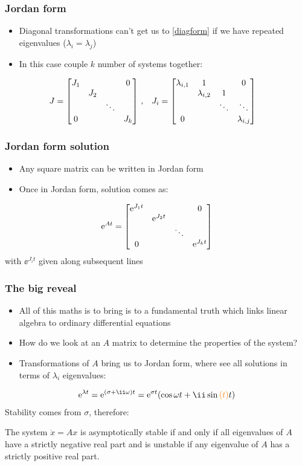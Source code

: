 \documentclass{beamer-control}
\begin{document}
\begin{frame}
\frametitle{Jordan form}
\begin{itemize}
\item Diagonal transformations can't get us to \eqref{diagform} if we have repeated eigenvalues ($\lambda_i=\lambda_j$)
\item In this case couple $k$ number of systems together:
\end{itemize}
\begin{align}
J   &= \begin{bmatrix} J_1 &  &  & 0 \\  & J_2 &  &  \\  &  & \ddots &  \\ 0 &  &  & J_k \end{bmatrix} \,, &
J_i &= \begin{bmatrix} \lambda_{i,1} & 1 &  & 0 \\  & \lambda_{i,2} & 1 &  \\  &  & \ddots &  \ddots \\ 0 &  &  & \lambda_{i,j} \end{bmatrix}
\end{align}
\end{frame}

\begin{frame}
\frametitle{Jordan form solution}
\begin{itemize}
\item Any square matrix can be written in Jordan form 
\item Once in Jordan form, solution comes as:
\end{itemize}
\begin{align}
\mathrm{e}^{At} = \begin{bmatrix} \mathrm{e}^{J_1 t} &  &  & 0 \\  & \mathrm{e}^{J_2 t} &  &  \\  &  & \ddots &  \\ 0 &  &  & \mathrm{e}^{J_k t} \end{bmatrix}
\end{align}
with $\ee^{J_i t}$ given along subsequent lines 
\end{frame}

\begin{frame}
\frametitle{The big reveal}
\begin{itemize}
\item All of this maths is to bring is to a fundamental truth which links linear algebra to ordinary differential equations
\item How do we look at an $A$ matrix to determine the properties of the system?
\item Transformations of $A$ bring us to Jordan form, where see all solutions in terms of $\lambda_i$ eigenvalues:
\end{itemize}
\begin{align}
\ee^{\lambda t} = \ee^{(\sigma + \ii \ww)t} = \ee^{\sigma t} ( \cos \ww t + \ii \sin \tt t)
\end{align}
Stability comes from $\sigma$, therefore:
\begin{theorem}
The system $\dot x=Ax$ is asymptotically stable if and only if all eigenvalues of $A$ have a strictly negative
real part and is unstable if any eigenvalue of $A$ has a strictly positive real part.
\end{theorem}
\end{frame}



\SUMMARYFRAME
\FINALE
\end{document}
